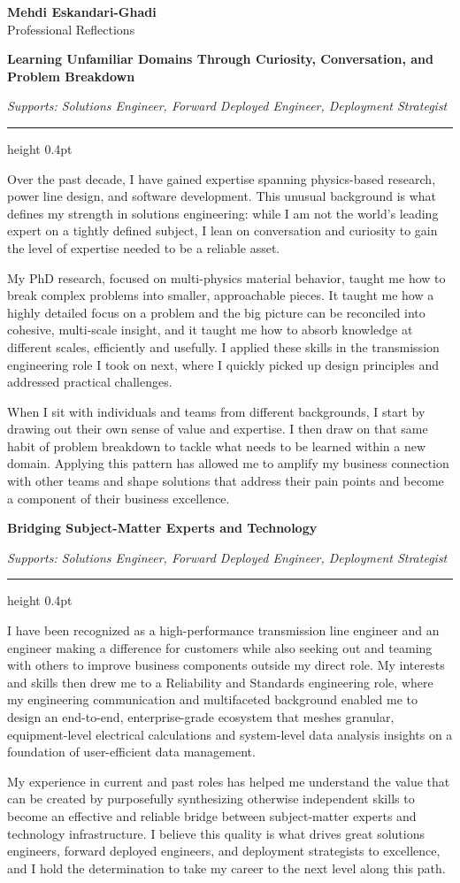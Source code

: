 \documentclass[11pt, letterpaper]{article}
\newcommand{\reflection}[2]{%
  \vspace{12pt}%
  {\large\bfseries #1}\par%
  \vspace{1pt}%
  {\small\itshape Supports: #2}\par%
  \vspace{2pt}%
  \hrule height 0.4pt%
  \vspace{4pt}%
}
\begin{document}
\pagestyle{empty}

\begin{center}
  {\LARGE\bfseries Mehdi Eskandari-Ghadi}\\[4pt]
  Professional Reflections
\end{center}

\reflection{Learning Unfamiliar Domains Through Curiosity, Conversation, and Problem Breakdown}{Solutions Engineer, Forward Deployed Engineer, Deployment Strategist}

Over the past decade, I have gained expertise spanning physics-based research, power line design, and software development. This unusual background is what defines my strength in solutions engineering: while I am not the world's leading expert on a tightly defined subject, I lean on conversation and curiosity to gain the level of expertise needed to be a reliable asset.

My PhD research, focused on multi-physics material behavior, taught me how to break complex problems into smaller, approachable pieces. It taught me how a highly detailed focus on a problem and the big picture can be reconciled into cohesive, multi-scale insight, and it taught me how to absorb knowledge at different scales, efficiently and usefully. I applied these skills in the transmission engineering role I took on next, where I quickly picked up design principles and addressed practical challenges.

When I sit with individuals and teams from different backgrounds, I start by drawing out their own sense of value and expertise. I then draw on that same habit of problem breakdown to tackle what needs to be learned within a new domain. Applying this pattern has allowed me to amplify my business connection with other teams and shape solutions that address their pain points and become a component of their business excellence.

\reflection{Bridging Subject-Matter Experts and Technology}{Solutions Engineer, Forward Deployed Engineer, Deployment Strategist}

I have been recognized as a high-performance transmission line engineer and an engineer making a difference for customers while also seeking out and teaming with others to improve business components outside my direct role. My interests and skills then drew me to a Reliability and Standards engineering role, where my engineering communication and multifaceted background enabled me to design an end-to-end, enterprise-grade ecosystem that meshes granular, equipment-level electrical calculations and system-level data analysis insights on a foundation of user-efficient data management.

My experience in current and past roles has helped me understand the value that can be created by purposefully synthesizing otherwise independent skills to become an effective and reliable bridge between subject-matter experts and technology infrastructure. I believe this quality is what drives great solutions engineers, forward deployed engineers, and deployment strategists to excellence, and I hold the determination to take my career to the next level along this path.
\end{document}
